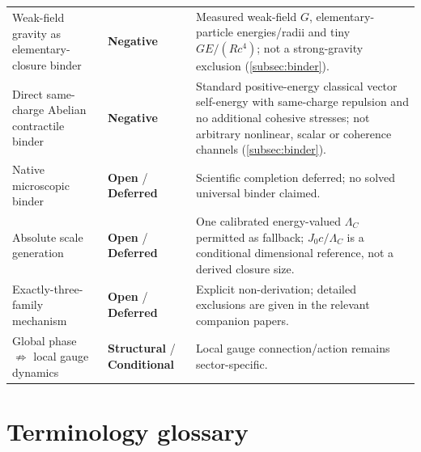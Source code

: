 \documentclass[11pt]{article}
\theoremstyle{definition}
\newcommand{\statusStructural}{\textcolor{blue!55!black}{\textbf{Structural}}}
\newcommand{\statusConditional}{\textcolor{yellow!60!black}{\textbf{Conditional}}}
\newcommand{\statusNegative}{\textcolor{red!65!black}{\textbf{Negative}}}
\newcommand{\statusDeferred}{\textcolor{gray!70!black}{\textbf{Deferred}}}
\newcommand{\statusOpen}{\textcolor{red!75!black}{\textbf{Open}}}
\begin{document}
\begin{longtable}{@{}P{4.9cm}P{3.0cm}P{6.8cm}@{}}
Weak-field gravity as elementary-closure binder & \statusNegative{} & Measured weak-field $G$, elementary-particle energies/radii and tiny $GE/(Rc^4)$; not a strong-gravity exclusion (\cref{subsec:binder}). \\
Direct same-charge Abelian contractile binder & \statusNegative{} & Standard positive-energy classical vector self-energy with same-charge repulsion and no additional cohesive stresses; not arbitrary nonlinear, scalar or coherence channels (\cref{subsec:binder}). \\
Native microscopic binder & \statusOpen{} / \statusDeferred{} & Scientific completion deferred; no solved universal binder claimed. \\
Absolute scale generation & \statusOpen{} / \statusDeferred{} & One calibrated energy-valued $\Lambda_C$ permitted as fallback; $J_0c/\Lambda_C$ is a conditional dimensional reference, not a derived closure size. \\
Exactly-three-family mechanism & \statusOpen{} / \statusDeferred{} & Explicit non-derivation; detailed exclusions are given in the relevant companion papers. \\
Global phase $\not\Rightarrow$ local gauge dynamics & \statusStructural{} / \statusConditional{} & Local gauge connection/action remains sector-specific. \\
\bottomrule
\end{longtable}
\normalsize

\section{Terminology glossary}
\label{app:glossary}
\end{document}
